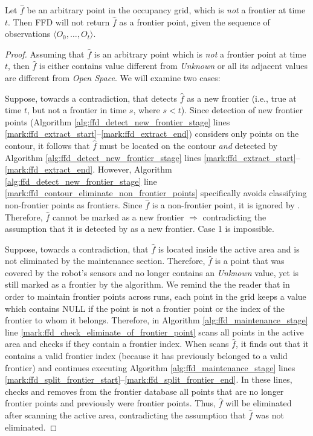 \begin{theorem}
\label{thm:sound}
Let $\hat{f}$ be an arbitrary point in the occupancy grid, which is \emph{not}
a frontier at time $t$. Then FFD will not return $\hat{f}$ as a frontier point,
given the sequence of observations $\langle O_0,\ldots,O_t\rangle$.
\end{theorem}

\begin{proof}
Assuming that $\hat{f}$ is an arbitrary point which is \emph{not} a frontier
point at time $t$, then $\hat{f}$ is either contains value different from
\emph{Unknown} or all its adjacent values are different from \emph{Open
Space}. We will examine two cases:

Suppose, towards a contradiction, that \FFD detects $\hat{f}$ as a new frontier
(i.e., true at time $t$, but not a frontier in time $s$, where $s<t$).
Since detection of new frontier points (Algorithm \ref{alg:ffd_detect_new_frontier_stage} lines
\ref{mark:ffd_extract_start}--\ref{mark:ffd_extract_end}) considers only points
on the contour, it follows that $\hat{f}$ must be located on the contour
\emph{and} detected by Algorithm \ref{alg:ffd_detect_new_frontier_stage} lines
\ref{mark:ffd_extract_start}--\ref{mark:ffd_extract_end}. However, Algorithm
\ref{alg:ffd_detect_new_frontier_stage} line \ref{mark:ffd_contour_eliminate_non_frontier_points}
specifically avoids classifying non-frontier points as frontiers. Since $\hat{f}$ is a non-frontier
point, it is ignored by \FFD. Therefore, $\hat{f}$ cannot be marked as a new
frontier $\Rightarrow$ contradicting the assumption that it is detected by \FFD
as a new frontier. Case 1 is impossible.

 Suppose, towards a contradiction, that $\hat{f}$ is
located inside the active area and is not eliminated by the maintenance section.
Therefore, $\hat{f}$ is a point that was covered by the robot's sensors and no
longer contains an \emph{Unknown} value, yet is still marked as a frontier by
the \FFD algorithm.
We remind the the reader that in order to maintain frontier points across runs,
each point in the grid keeps a value which contains NULL if the point is not a
frontier point or the index of the frontier to whom it belongs.
Therefore, in Algorithm \ref{alg:ffd_maintenance_stage} line
\ref{mark:ffd_check_eliminate_of_frontier_point} \FFD scans all points in the
active area and checks if they contain a frontier index. When \FFD scans
$\hat{f}$, it finds out that it contains a valid frontier index (because it
has previously belonged to a valid frontier) and continues executing
Algorithm \ref{alg:ffd_maintenance_stage} lines
\ref{mark:ffd_split_frontier_start}--\ref{mark:ffd_split_frontier_end}. In
these lines, \FFD checks and removes from the frontier database all points that
are no longer frontier points and previously were frontier points. Thus,
$\hat{f}$ will be eliminated after scanning the active area, contradicting the
assumption that $\hat{f}$ was not eliminated.


\end{proof}
